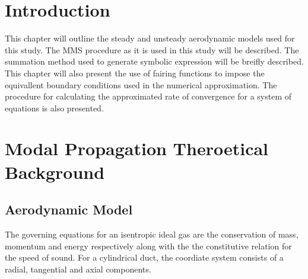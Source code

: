 \section{Introduction}

This chapter will outline the steady and unsteady aerodynamic
models used for this study. The MMS procedure as it is used in this study will 
be described. The summation method used to generate symbolic expression will 
be breifly described. This chapter will also present the use of fairing functions 
to impose the equivallent boundary conditions used in the numerical approximation.
The procedure for calculating the approximated rate of convergence for a system
of equations is also presented.

\section{Modal Propagation Theroetical Background}
\subsection{Aerodynamic Model}

The governing equations for an isentropic ideal gas are the conservation of 
mass, momentum and energy respectively along with the the constitutive relation 
for the speed of sound. For a cylindrical duct, the coordiate system consists
of a radial, tangential and axial components.  




